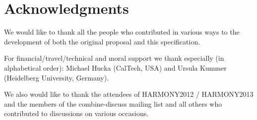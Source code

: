 
\section{Acknowledgments}
 We would like to thank all the people who contributed in various ways 
to the development of both the original proposal and this specification. 

For financial/travel/technical and moral support we thank especially (in 
alphabetical order): Michael Hucka (CalTech, USA) and Ursula Kummer 
(Heidelberg University, Germany). 

We also would like to thank the attendees of HARMONY2012 / HARMONY2013 
and the members of the \textsf{combine-discuss} mailing list and all 
others who contributed to discussions on various occasions. 

